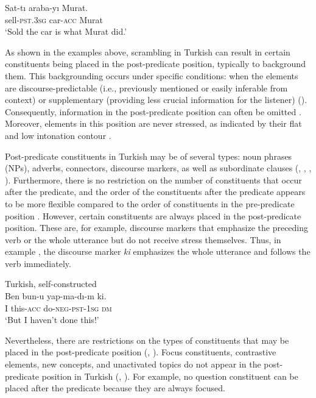 \ex\label{ex:key:3f} 
\gll Sat-tı     araba-yı   Murat.\\
sell-\textsc{pst}.3\textsc{sg}  car-\textsc{acc}  Murat\\
\glt ‘Sold the car is what Murat did.’
\z
\z


As shown in the examples above, scrambling in Turkish can result in certain constituents being placed in the post-predicate position, typically to background them. This backgrounding occurs under specific conditions: when the elements are discourse-predictable (i.e., previously mentioned or easily inferable from context) or supplementary (providing less crucial information for the listener) (\citealt{Erguvanli1984}). Consequently, information in the post-predicate position can often be omitted \citep{Hoffman1995}. Moreover, elements in this position are never stressed, as indicated by their flat and low intonation contour \citep{Kornfilt1997}.

Post-predicate constituents in Turkish may be of several types: noun phrases (NPs), adverbs, connectors, discourse markers, as well as subordinate clauses (\citealt{AkanHartmann2019}, \citealt{Erguvanli1984}, \citealt{Kornfilt1998}, \citealt{GokselKerslake2004}). Furthermore, there is no restriction on the number of constituents that occur after the predicate, and the order of the constituents after the predicate appears to be more flexible compared to the order of constituents in the pre-predicate position \citep{Skopeteas2015}. However, certain constituents are always placed in the post-predicate position. These are, for example, discourse markers that emphasize the preceding verb or the whole utterance but do not receive stress themselves. Thus, in example , the discourse marker \textit{ki} emphasizes the whole utterance and follows the verb immediately.


\ea%
  \label{ex:key:4} Turkish, self-constructed \\
  \gll Ben  bun-u    yap-ma-dı-m    ki.\\
 I  this-\textsc{acc}  do-\textsc{neg-pst-1sg}  \textsc{dm}\\
 \glt  ‘But I haven’t done this!’ 
  \z

Nevertheless, there are restrictions on the types of constituents that may be placed in the post-predicate position (\citealt{Erguvanli1984}, \citealt{GokselKerslake2004}). Focus constituents, contrastive elements, new concepts, and unactivated topics do not appear in the post-predicate position in Turkish (\citealt{Erguvanli1984}, \citealt{Schroeder1995}). For example, no question constituent can be placed after the predicate because they are always focused.


